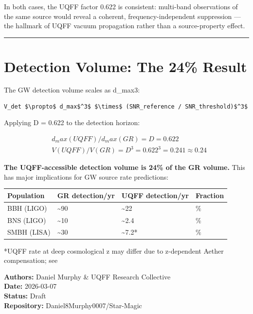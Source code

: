 \documentclass[12pt,a4paper]{article}
\begin{document}
In both cases, the UQFF factor 0.622 is consistent: multi-band observations of the same source would reveal a coherent, frequency-independent suppression --- the hallmark of UQFF vacuum propagation rather than a source-property effect.

\medskip\hrule\medskip

\section{Detection Volume: The 24\% Result}

The GW detection volume scales as d\_max3:

\begin{verbatim}
V_det $\propto$ d_max$^3$ $\times$ (SNR_reference / SNR_threshold)$^3$
\end{verbatim}

Applying D = 0.622 to the detection horizon:

\begin{equation}
\begin{aligned}
  & d_max(UQFF) / d_max(GR) = D = 0.622 \\
  & V(UQFF) / V(GR) = D^3 = 0.622^3 = 0.241 \approx 0.24
\end{aligned}
\end{equation}

\textbf{The UQFF-accessible detection volume is 24\% of the GR volume.} This has major implications for GW source rate predictions:

\begin{table}[H]
\centering
\small
\begin{tabularx}{\linewidth}{@{}>{\raggedright\arraybackslash}X>{\raggedright\arraybackslash}X>{\raggedright\arraybackslash}X>{\raggedright\arraybackslash}X@{}}
\toprule
Population & GR detection/yr & UQFF detection/yr & Fraction \tabularnewline
\midrule
BBH (LIGO) & \textasciitilde{}90 & \textasciitilde{}22 & 24\% \tabularnewline
BNS (LIGO) & \textasciitilde{}10 & \textasciitilde{}2.4 & 24\% \tabularnewline
SMBH (LISA) & \textasciitilde{}30 & \textasciitilde{}7.2* & 24\% \tabularnewline
\bottomrule
\end{tabularx}
\end{table}

*UQFF rate at deep cosmological z may differ due to z-dependent Aether compensation; see

\begin{flushleft}
\textbf{Authors:} Daniel Murphy \& UQFF Research Collective \\
\textbf{Date:} 2026-03-07 \\
\textbf{Status:} Draft \\
\textbf{Repository:} Daniel8Murphy0007/Star-Magic \\
\end{flushleft}
\end{document}
